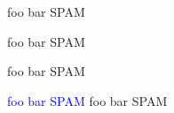 \documentclass[12pt]{article}
\begin{document}
\ECFIntimacy
foo bar SPAM


\huge
foo bar SPAM


\fontsize{40}{45}\selectfont
foo bar SPAM

\textcolor{blue}{foo bar SPAM}
\newline
\textcolor{color1}{foo bar SPAM}
\end{document}
